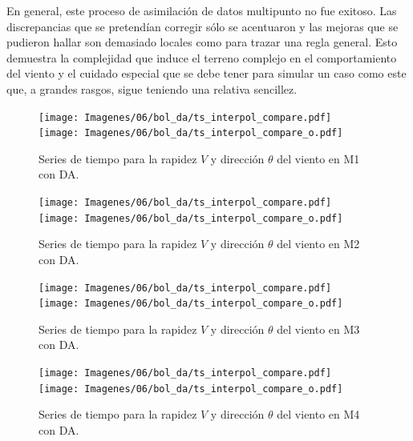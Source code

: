 En general, este proceso de asimilación de datos multipunto no fue exitoso. Las discrepancias que se pretendían corregir sólo se acentuaron y las mejoras que se pudieron hallar son demasiado locales como para trazar una regla general. Esto demuestra la complejidad que induce el terreno complejo en el comportamiento del viento y el cuidado especial que se debe tener para simular un caso como este que, a grandes rasgos, sigue teniendo una relativa sencillez.
\newpage
\vspace*{\fill}
\begin{figure}[H]
	\centering
	\texttt{[image: Imagenes/06/bol\_da/ts\_interpol\_compare.pdf]}\\%
	\texttt{[image: Imagenes/06/bol\_da/ts\_interpol\_compare\_o.pdf]}%
	\vspace{-2mm}\caption{Series de tiempo para la rapidez $V$ y dirección $\theta$ del viento en M1 con DA.}
	\label{fig:06_bol_da_ts_m1}
\end{figure}
\vspace*{\fill}
\begin{figure}[H]
	\centering
	\texttt{[image: Imagenes/06/bol\_da/ts\_interpol\_compare.pdf]}\\%
	\texttt{[image: Imagenes/06/bol\_da/ts\_interpol\_compare\_o.pdf]}%
	\vspace{-2mm}\caption{Series de tiempo para la rapidez $V$ y dirección $\theta$ del viento en M2 con DA.}
	\label{fig:06_bol_da_ts_m2}
\end{figure}
\vspace*{\fill}
\newpage
\vspace*{\fill}
\begin{figure}[H]
	\centering
	\texttt{[image: Imagenes/06/bol\_da/ts\_interpol\_compare.pdf]}\\%
	\texttt{[image: Imagenes/06/bol\_da/ts\_interpol\_compare\_o.pdf]}%
	\vspace{-2mm}\caption{Series de tiempo para la rapidez $V$ y dirección $\theta$ del viento en M3 con DA.}
	\label{fig:06_bol_da_ts_m3}
\end{figure}
\vspace*{\fill}
\begin{figure}[H]
	\centering
	\texttt{[image: Imagenes/06/bol\_da/ts\_interpol\_compare.pdf]}\\%
	\texttt{[image: Imagenes/06/bol\_da/ts\_interpol\_compare\_o.pdf]}%
	\vspace{-2mm}\caption{Series de tiempo para la rapidez $V$ y dirección $\theta$ del viento en M4 con DA.}
	\label{fig:06_bol_da_ts_m4}
\end{figure}

